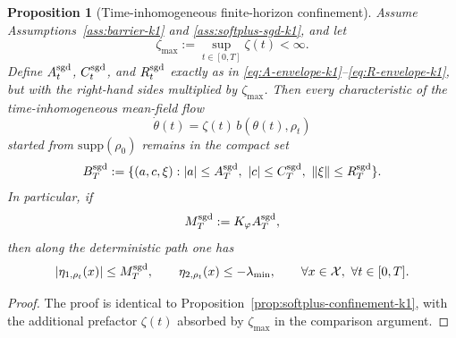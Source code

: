 \documentclass[11pt]{article}
\newtheorem{proposition}[theorem]{Proposition}
\theoremstyle{definition}
\newcommand{\supp}{\mathrm{supp}}
\newcommand{\norm}[1]{\left\lVert #1 \right\rVert}
\newcommand{\mc}[1]{\mathcal{#1}}
\begin{document}
\begin{proposition}[Time-inhomogeneous finite-horizon confinement]
\label{prop:sgd-confinement-k1}
Assume Assumptions~\ref{ass:barrier-k1} and \ref{ass:softplus-sgd-k1}, and let
\[
  \zeta_{\max}:=\sup_{t\in[0,T]}\zeta(t)<\infty.
\]
Define $A_t^{\rm sgd}$, $C_t^{\rm sgd}$, and $R_t^{\rm sgd}$ exactly as in
\eqref{eq:A-envelope-k1}--\eqref{eq:R-envelope-k1}, but with the right-hand
sides multiplied by $\zeta_{\max}$. Then every characteristic of the
time-inhomogeneous mean-field flow
\[
  \dot\theta(t)=\zeta(t)\,b(\theta(t),\rho_t)
\]
started from $\supp(\rho_0)$ remains in the compact set
\[
  B_T^{\rm sgd}
  :=
  \{(a,c,\xi): |a|\le A_T^{\rm sgd},\ |c|\le C_T^{\rm sgd},\ \norm{\xi}\le R_T^{\rm sgd}\}.
\]
In particular, if
\[
  M_T^{\rm sgd}:=K_\varphi A_T^{\rm sgd},
\]
then along the deterministic path one has
\[
  |\eta_{1,\rho_t}(x)|\le M_T^{\rm sgd},
  \qquad
  \eta_{2,\rho_t}(x)\le -\lambda_{\min},
  \qquad
  \forall x\in\mc{X},\ \forall t\in[0,T].
\]
\end{proposition}

\begin{proof}
The proof is identical to Proposition~\ref{prop:softplus-confinement-k1}, with
the additional prefactor $\zeta(t)$ absorbed by $\zeta_{\max}$ in the comparison
argument.
\end{proof}
\end{document}
